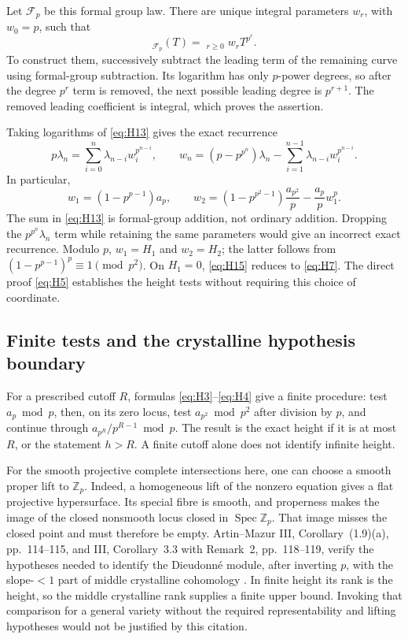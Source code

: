 Let $\mathcal F_p$ be this formal group law. There are unique integral
parameters $w_r$, with $w_0=p$, such that
\begin{equation}
 [p]_{\mathcal F_p}(T)
 =\mathop{\sum\nolimits^{\mathcal F_p}}_{r\ge0}w_rT^{p^r}.
                                                               \label{eq:H13}
\end{equation}
To construct them, successively subtract the leading term of the
remaining curve using formal-group subtraction. Its logarithm has only
$p$-power degrees, so after the degree $p^r$ term is removed, the next
possible leading degree is $p^{r+1}$. The removed leading coefficient
is integral, which proves the assertion.

Taking logarithms of \eqref{eq:H13} gives the exact recurrence
\begin{equation}
 p\lambda_n=\sum_{i=0}^n\lambda_{n-i}w_i^{p^{n-i}},
 \qquad
 w_n=(p-p^{p^n})\lambda_n
        -\sum_{i=1}^{n-1}\lambda_{n-i}w_i^{p^{n-i}}.              \label{eq:H14}
\end{equation}
In particular,
\begin{equation}
 w_1=(1-p^{p-1})a_p,\qquad
 w_2=(1-p^{p^2-1})\frac{a_{p^2}}p
                   -\frac{a_p}{p}w_1^p.                       \label{eq:H15}
\end{equation}
The sum in \eqref{eq:H13} is formal-group addition, not ordinary addition.
Dropping the $p^{p^n}\lambda_n$ term while retaining the same
parameters would give an incorrect exact recurrence.
Modulo $p$, $w_1=H_1$ and $w_2=H_2$; the latter follows from
$(1-p^{p-1})^p\equiv1\pmod{p^2}$.
On $H_1=0$, \eqref{eq:H15} reduces to \eqref{eq:H7}.
The direct proof \eqref{eq:H5} establishes the height tests without requiring
this choice of coordinate.

\subsection{Finite tests and the crystalline hypothesis boundary}
For a prescribed cutoff $R$, formulas \eqref{eq:H3}--\eqref{eq:H4} give a finite procedure:
test $a_p\bmod p$, then, on its zero locus, test $a_{p^2}\bmod p^2$
after division by $p$, and continue through
$a_{p^R}/p^{R-1}\bmod p$.
The result is the exact height if it is at most $R$, or the statement
$h>R$. A finite cutoff alone does not identify infinite height.

For the smooth projective complete intersections here, one can choose
a smooth proper lift to $\mathbb Z_p$. Indeed, a homogeneous lift of
the nonzero equation gives a flat projective hypersurface. Its special
fibre is smooth, and properness makes the image of the closed
nonsmooth locus closed in $\operatorname{Spec}\mathbb Z_p$.
That image misses the closed point and must therefore be empty.
Artin--Mazur III,
Corollary~(1.9)(a), pp.~114--115, and III, Corollary~3.3 with
Remark~2, pp.~118--119, verify the hypotheses needed to identify the
Dieudonn\'e module, after inverting $p$, with the slope-$<1$ part of middle crystalline
cohomology \citep{AM}. In finite height its rank is the
height, so the middle crystalline rank supplies a finite upper bound.
Invoking that comparison for a general variety without the required
representability and lifting hypotheses would not be justified by
this citation.
